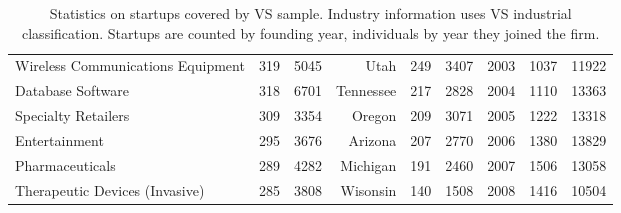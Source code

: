 \begin{table}[!htb]
\begin{tabular}{p{4.5cm}llrllrll}
  Wireless Communications Equipment & 319 & 5045 & Utah & 249 & 3407 & 2003 & 1037 & 11922 \\ 
  Database Software & 318 & 6701 & Tennessee & 217 & 2828 & 2004 & 1110 & 13363 \\ 
  Specialty Retailers & 309 & 3354 & Oregon & 209 & 3071 & 2005 & 1222 & 13318 \\ 
  Entertainment & 295 & 3676 & Arizona & 207 & 2770 & 2006 & 1380 & 13829 \\ 
  Pharmaceuticals & 289 & 4282 & Michigan & 191 & 2460 & 2007 & 1506 & 13058 \\ 
  Therapeutic Devices (Invasive) & 285 & 3808 & Wisonsin & 140 & 1508 & 2008 & 1416 & 10504 \\ 
   \bottomrule
\end{tabular}
\endgroup
\caption{Statistics on startups covered by VS sample. Industry information uses VS industrial classification. Startups are counted by founding year, individuals by year they joined the firm.} 
\label{table:VS_summaryTable}
\end{table}
